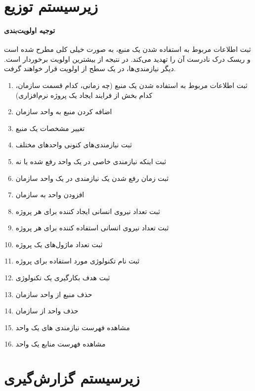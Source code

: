 \section{زیرسیستم توزیع}
\paragraph{توجیه اولویت‌بندی}
ثبت اطلاعات مربوط به استفاده شدن یک منبع، به صورت خیلی کلی مطرح شده است و ریسک درک نادرست آن را تهدید می‌کند. در نتیجه از بیشترین اولویت برخوردار است. دیگر نیازمندی‌ها، در یک سطح از اولویت قرار خواهند گرفت.
\begin{enumerate}
	\item ثبت اطلاعات مربوط به استفاده شدن یک منبع (چه زمانی، کدام قسمت سازمان، کدام بخش از فرایند ایجاد یک پروژه نرم‌افزاری)
	\item اضافه کردن منبع به واحد سازمان
	\item تغییر مشخصات یک منبع
	\item ثبت نیازمندی‌های کنونی واحدهای مختلف
	\item ثبت اینکه نیازمندی خاصی در یک واحد رفع شده یا نه
	\item ثبت زمان رفع شدن یک نیازمندی در یک واحد سازمان
	\item افزودن واحد به سازمان
	\item ثبت تعداد نیروی انسانی ایجاد کننده برای هر پروژه
	\item ثبت تعداد نیروی انسانی استفاده کننده برای هر پروژه
	\item ثبت تعداد ماژول‌های یک پروژه
	\item ثبت نام تکنولوژی مورد استفاده برای پروژه
	\item ثبت هدف بکارگیری یک تکنولوژی
	\item حذف منبع از واحد سازمان
	\item حذف واحد از سازمان
	\item مشاهده فهرست نیازمندی های یک واحد
	\item مشاهده فهرست منابع یک واحد
\end{enumerate}

\section{زیرسیستم گزارش‌گیری}
